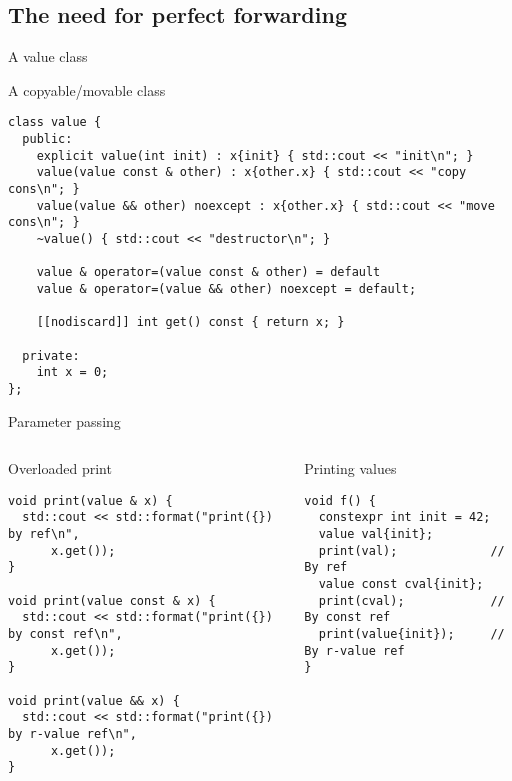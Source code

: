 \subsection{The need for perfect forwarding}

\begin{frame}[t,fragile]{A value class}
\begin{block}{A copyable/movable class}
\begin{lstlisting}
class value {
  public:
    explicit value(int init) : x{init} { std::cout << "init\n"; }
    value(value const & other) : x{other.x} { std::cout << "copy cons\n"; }
    value(value && other) noexcept : x{other.x} { std::cout << "move cons\n"; }
    ~value() { std::cout << "destructor\n"; }

    value & operator=(value const & other) = default 
    value & operator=(value && other) noexcept = default;

    [[nodiscard]] int get() const { return x; }

  private:
    int x = 0;
};
\end{lstlisting}
\end{block}
\end{frame}

\begin{frame}[t,fragile]{Parameter passing}

\begin{columns}[T]

\begin{block}{Overloaded print}
\begin{lstlisting}
void print(value & x) {
  std::cout << std::format("print({}) by ref\n", 
      x.get());
}

void print(value const & x) {
  std::cout << std::format("print({}) by const ref\n", 
      x.get());
}

void print(value && x) { 
  std::cout << std::format("print({}) by r-value ref\n", 
      x.get());
}
\end{lstlisting}
\end{block}

\pause
{}
\begin{block}{Printing values}
\begin{lstlisting}
void f() {
  constexpr int init = 42;
  value val{init};
  print(val);             // By ref
  value const cval{init}; 
  print(cval);            // By const ref
  print(value{init});     // By r-value ref
}
\end{lstlisting}
\end{block}

\end{columns}

\end{frame}

